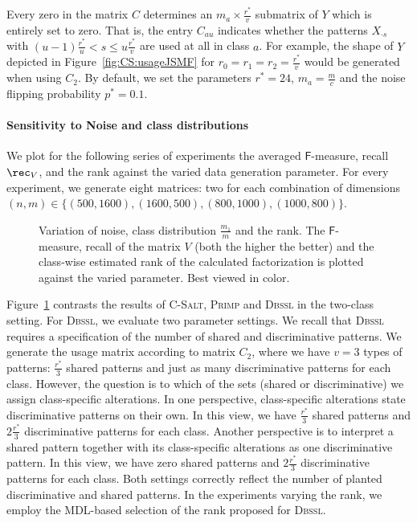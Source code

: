 Every zero in the matrix $C$ determines an $m_a\times \frac{r^*}{v}$ submatrix of $Y$ which is entirely set to zero. That is, the entry $C_{au}$ indicates whether the patterns $X_{\cdot s}$ with $(u-1)\frac{r^*}{u}<s\leq u\frac{r^*}{v}$ are used at all in class $a$.
For example, the shape of $Y$ depicted in Figure~\ref{fig:CS:usageJSMF} for $r_0=r_1=r_2=\frac{r^*}{v}$ would be generated when using $C_2$.
By default, we set the parameters $r^*=24$, $m_a=\frac{m}{c}$ and the noise flipping probability $p^*=0.1$.

\paragraph{Sensitivity to Noise and class distributions}
We plot for the following series of experiments the averaged $\mathsf{F}$-measure, recall $\rec_V$, and the rank against the varied data generation parameter. For every experiment, we generate eight matrices: two for each combination of dimensions $(n,m)\in\{(500,1600),\allowbreak(1600,500),\allowbreak(800,1000),\allowbreak(1000,800)\}$.
\begin{figure}[t!]
\centering

\caption{Variation of noise, class distribution $\frac{m_1}{m}$  and the rank. The $\mathsf{F}$-measure, recall of the matrix $V$ (both the higher the better) and the class-wise estimated rank of the calculated factorization is plotted against the varied parameter. Best viewed in color.}
\label{fig:CS:noise}
\end{figure}

Figure~\ref{fig:CS:noise} contrasts the results of \textsc{C-Salt}, \textsc{Primp} and \textsc{Dbssl} in the two-class setting. For \textsc{Dbssl}, we evaluate two parameter settings. We recall that \textsc{Dbssl} requires a specification of the number of shared and discriminative patterns. We generate the usage matrix according to matrix $C_2$, where we have $v=3$ types of patterns: $\frac{r^*}{3}$ shared patterns and just as many discriminative patterns for each class. However, the question is to which of the sets (shared or discriminative) we assign class-specific alterations. In one perspective, class-specific alterations state discriminative patterns on their own. In this view, we have $\frac{r^*}{3}$ shared patterns and $2\frac{r^*}{3}$ discriminative patterns for each class. Another perspective is to interpret a shared pattern together with its class-specific alterations as one discriminative pattern. In this view, we have zero shared patterns and $2\frac{r^*}{3}$ discriminative patterns for each class. Both settings correctly reflect the number of planted discriminative and shared patterns. In the experiments varying the rank, we employ the MDL-based selection of the rank proposed for \textsc{Dbssl}. %


